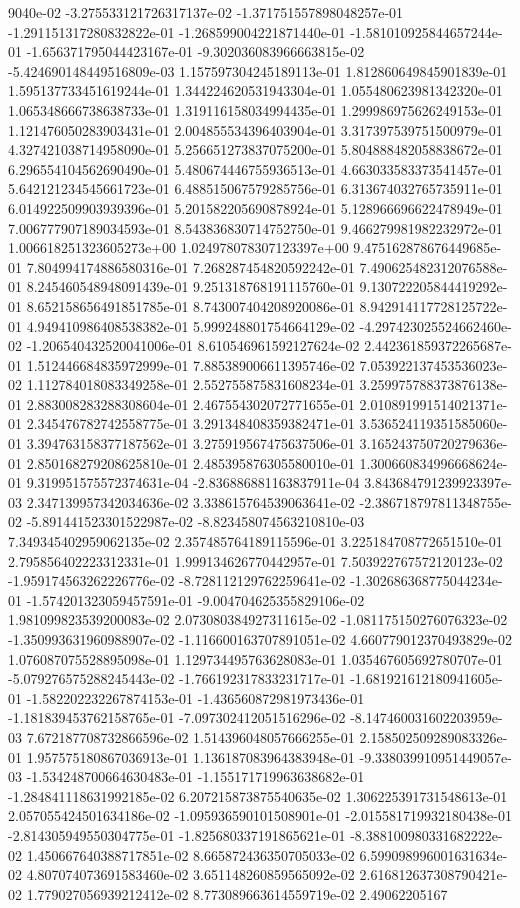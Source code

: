 9040e-02	-3.275533121726317137e-02	-1.371751557898048257e-01	-1.291151317280832822e-01	-1.268599004221871440e-01	-1.581010925844657244e-01	-1.656371795044423167e-01	-9.302036083966663815e-02	-5.424690148449516809e-03	1.157597304245189113e-01	1.812860649845901839e-01	1.595137733451619244e-01	1.344224620531943304e-01	1.055480623981342320e-01	1.065348666738638733e-01	1.319116158034994435e-01	1.299986975626249153e-01	1.121476050283903431e-01	2.004855534396403904e-01	3.317397539751500979e-01	4.327421038714958090e-01	5.256651273837075200e-01	5.804888482058838672e-01	6.296554104562690490e-01	5.480674446755936513e-01	4.663033583373541457e-01	5.642121234545661723e-01	6.488515067579285756e-01	6.313674032765735911e-01	6.014922509903939396e-01	5.201582205690878924e-01	5.128966696622478949e-01	7.006777907189034593e-01	8.543836830714752750e-01	9.466279981982232972e-01	1.006618251323605273e+00	1.024978078307123397e+00	9.475162878676449685e-01	7.804994174886580316e-01	7.268287454820592242e-01	7.490625482312076588e-01	8.245460548948091439e-01	9.251318768191115760e-01	9.130722205844419292e-01	8.652158656491851785e-01	8.743007404208920086e-01	8.942914117728125722e-01	4.949410986408538382e-01	5.999248801754664129e-02	-4.297423025524662460e-02	-1.206540432520041006e-01	8.610546961592127624e-02	2.442361859372265687e-01	1.512446684835972999e-01	7.885389006611395746e-02	7.053922137453536023e-02	1.112784018083349258e-01	2.552755875831608234e-01	3.259975788373876138e-01	2.883008283288308604e-01	2.467554302072771655e-01	2.010891991514021371e-01	2.345476782742558775e-01	3.291348408359382471e-01	3.536524119351585060e-01	3.394763158377187562e-01	3.275919567475637506e-01	3.165243750720279636e-01	2.850168279208625810e-01	2.485395876305580010e-01	1.300660834996668624e-01	9.319951575572374631e-04	-2.836886881163837911e-04	3.843684791239923397e-03	2.347139957342034636e-02	3.338615764539063641e-02	-2.386718797811348755e-02	-5.891441523301522987e-02	-8.823458074563210810e-03	7.349345402959062135e-02	2.357485764189115596e-01	3.225184708772651510e-01	2.795856402223312331e-01	1.999134626770442957e-01	7.503922767572120123e-02	-1.959174563262226776e-02	-8.728112129762259641e-02	-1.302686368775044234e-01	-1.574201323059457591e-01	-9.004704625355829106e-02	1.981099823539200083e-02	2.073080384927311615e-02	-1.081175150276076323e-02	-1.350993631960988907e-02	-1.116600163707891051e-02	4.660779012370493829e-02	1.076087075528895098e-01	1.129734495763628083e-01	1.035467605692780707e-01	-5.079276575288245443e-02	-1.766192317833231717e-01	-1.681921612180941605e-01	-1.582202232267874153e-01	-1.436560872981973436e-01	-1.181839453762158765e-01	-7.097302412051516296e-02	-8.147460031602203959e-03	7.672187708732866596e-02	1.514396048057666255e-01	2.158502509289083326e-01	1.957575180867036913e-01	1.136187083964383948e-01	-9.338039910951449057e-03	-1.534248700664630483e-01	-1.155171719963638682e-01	-1.284841118631992185e-02	6.207215873875540635e-02	1.306225391731548613e-01	2.057055424501634186e-02	-1.095936590101508901e-01	-2.015581719932180438e-01	-2.814305949550304775e-01	-1.825680337191865621e-01	-8.388100980331682222e-02	1.450667640388717851e-02	8.665872436350705033e-02	6.599098996001631634e-02	4.807074073691583460e-02	3.651148260859565092e-02	2.616812637308790421e-02	1.779027056939212412e-02	8.773089663614559719e-02	2.49062205167
